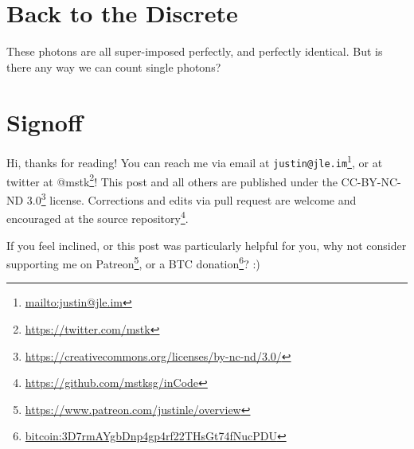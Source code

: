 \documentclass[]{article}
\renewcommand{\href}[2]{#2\footnote{\url{#1}}}
\begin{document}
\section{Back to the Discrete}\label{back-to-the-discrete}

These photons are all super-imposed perfectly, and perfectly identical. But is
there any way we can count single photons?

\section{Signoff}\label{signoff}

Hi, thanks for reading! You can reach me via email at
\href{mailto:justin@jle.im}{\nolinkurl{justin@jle.im}}, or at twitter at
\href{https://twitter.com/mstk}{@mstk}! This post and all others are published
under the \href{https://creativecommons.org/licenses/by-nc-nd/3.0/}{CC-BY-NC-ND
3.0} license. Corrections and edits via pull request are welcome and encouraged
at \href{https://github.com/mstksg/inCode}{the source repository}.

If you feel inclined, or this post was particularly helpful for you, why not
consider \href{https://www.patreon.com/justinle/overview}{supporting me on
Patreon}, or a \href{bitcoin:3D7rmAYgbDnp4gp4rf22THsGt74fNucPDU}{BTC donation}?
:)
\end{document}

